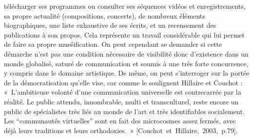 \documentclass[a4paper,12pt]{article}
\newcommand{\guill}[1]{«~#1~»}
\newcommand{\guilldeux}[1]{“#1”}
\newcommand{\cicite}[1]{{\footnotesize[#1]}}
\begin{document}
télécharger ses programmes ou consulter ses séquences vidéos et enregistrements, sa propre actualité (compositions, concerts), de nombreux éléments biographiques, une liste exhaustive de ses écrits, et un recensement des publications à son propos. Cela représente un travail considérable qui lui permet de faire sa propre muséification. On peut cependant se demander si cette démarche n'est pas une condition nécessaire de visibilité donc d'existence dans un monde globalisé, saturé de communication et soumis à une très forte concurrence, y compris dans le domaine artistique. De même, on peut s'interroger sur la portée de la démocratisation qu'elle vise, car comme le soulignent Hillaire et Couchot : \guill{L'ambitieuse volonté d'une communication universelle est contrecarrée par la réalité. Le public attendu, innombrable, multi et transculturel, reste encore un public de spécialistes très liés au monde de l'art et très identifiables socialement. Les \guilldeux{communautés virtuelles} sont en fait des microcosmes assez fermés, avec déjà leurs traditions et leurs orthodoxies.} \cicite{Couchot~et~Hillaire,~2003,~p.79}.
\end{document}
